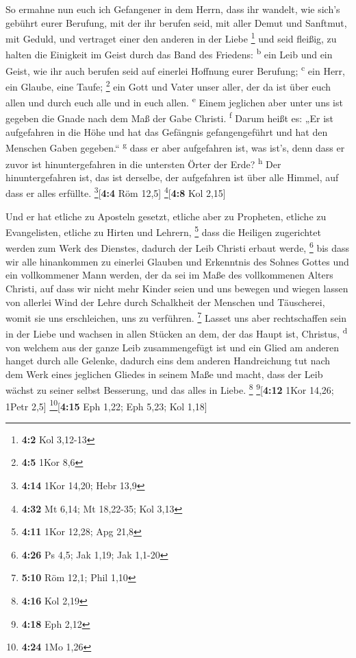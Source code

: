  So ermahne nun euch ich Gefangener in dem Herrn, dass ihr
wandelt, wie sich's gebührt eurer Berufung, mit der ihr berufen seid,
 mit aller Demut und Sanftmut, mit Geduld, und vertraget
einer den anderen in der Liebe \footnote{\textbf{4:2} Kol 3,12-13}
 und seid fleißig, zu halten die Einigkeit im Geist durch
das Band des Friedens: \textsuperscript{b}  ein Leib und
ein Geist, wie ihr auch berufen seid auf einerlei Hoffnung eurer
Berufung; \textsuperscript{c}  ein Herr, ein Glaube, eine
Taufe; \footnote{\textbf{4:5} 1Kor 8,6}  ein Gott und
Vater unser aller, der da ist über euch allen und durch euch alle und in
euch allen. \textsuperscript{e}  Einem jeglichen aber
unter uns ist gegeben die Gnade nach dem Maß der Gabe Christi.
\textsuperscript{f}  Darum heißt es: „Er ist aufgefahren
in die Höhe und hat das Gefängnis gefangengeführt und hat den Menschen
Gaben gegeben.`` \textsuperscript{g}  dass er aber
aufgefahren ist, was ist's, denn dass er zuvor ist hinuntergefahren in
die untersten Örter der Erde? \textsuperscript{h}  Der
hinuntergefahren ist, das ist derselbe, der aufgefahren ist über alle
Himmel, auf dass er alles erfüllte. \footnote{\textbf{4:14} 1Kor 14,20;
  Hebr 13,9}{[}\textbf{4:4} Röm 12,5{]} \footnote{\textbf{4:32} Mt 6,14;
  Mt 18,22-35; Kol 3,13}{[}\textbf{4:8} Kol 2,15{]}

 Und er hat etliche zu Aposteln gesetzt, etliche aber zu
Propheten, etliche zu Evangelisten, etliche zu Hirten und Lehrern,
\footnote{\textbf{4:11} 1Kor 12,28; Apg 21,8}  dass die
Heiligen zugerichtet werden zum Werk des Dienstes, dadurch der Leib
Christi erbaut werde, \footnote{\textbf{4:26} Ps 4,5; Jak 1,19; Jak
  1,1-20}  bis dass wir alle hinankommen zu einerlei
Glauben und Erkenntnis des Sohnes Gottes und ein vollkommener Mann
werden, der da sei im Maße des vollkommenen Alters Christi,
 auf dass wir nicht mehr Kinder seien und uns bewegen und
wiegen lassen von allerlei Wind der Lehre durch Schalkheit der Menschen
und Täuscherei, womit sie uns erschleichen, uns zu verführen.
\footnote{\textbf{5:10} Röm 12,1; Phil 1,10}  Lasset uns
aber rechtschaffen sein in der Liebe und wachsen in allen Stücken an
dem, der das Haupt ist, Christus, \textsuperscript{d} 
von welchem aus der ganze Leib zusammengefügt ist und ein Glied am
anderen hanget durch alle Gelenke, dadurch eins dem anderen Handreichung
tut nach dem Werk eines jeglichen Gliedes in seinem Maße und macht, dass
der Leib wächst zu seiner selbst Besserung, und das alles in Liebe.
\footnote{\textbf{4:16} Kol 2,19} \footnote{\textbf{4:18} Eph 2,12}{[}\textbf{4:12}
1Kor 14,26; 1Petr 2,5{]} \footnote{\textbf{4:24} 1Mo 1,26}{[}\textbf{4:15}
Eph 1,22; Eph 5,23; Kol 1,18{]}

